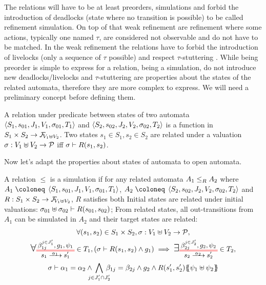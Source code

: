 \documentclass{article}
\begin{document}
The relations will have to be at least preorders, simulations and forbid the introduction of deadlocks (state where no transition is possible) to be called refinement simulation.
On top of that weak refinement are refinement where some actions, typically one named \(\tau\), are considered not observable and do not have to be matched.
In the weak refinement the relations have to forbid the introduction of livelocks (only a sequence of \(\tau\) possible) and respect \(\tau\)-stuttering .
While being preorder is simple to express for a relation, being a simulation, do not introduce new deadlocks/livelocks and \(\tau\)-stuttering are properties about the states of the related automata, therefore they are more complex to express.
We will need a preliminary concept before defining them.
\begin{defi}
A relation under predicate between states of two automata \(\OA{S_1}{s_{01}}{J_1}{V_1}{\sigma_{01}}{T_1}\) and \(\OA{S_2}{s_{02}}{J_2}{V_2}{\sigma_{02}}{T_2}\) is a function in \(S_1 \times S_2 \to \rformulae[V_1 \uplus V_2]\).
Two states \(s_1 \in S_1, s_2 \in S_2\) are related under a valuation \(\sigma: V_1 \uplus V_2 \to \values\) iff \(\sigma \vdash R\mpar{s_1, s_2}\).
\end{defi}
Now let's adapt the properties about states of automata to open automata.
\begin{defi}
A relation \(\leq\) is a simulation if for any related automata \(\wrel{A_1}{A_2}{R}\) where \(A_1 \defobject \OA{S_1}{s_{01}}{J_1}{V_1}{\sigma_{01}}{T_1}\), \(A_2 \defobject \OA{S_2}{s_{02}}{J_2}{V_2}{\sigma_{02}}{T_2}\) and \(R: S_1 \times S_2 \to \rformulae[V_1 \uplus V_2]\), \(R\) satisfies both
 Initial states are related under initial valuations: \(\sigma_{01} \uplus \sigma_{02} \vdash R\mpar{s_{01}, s_{02}}\);
 From related states, all out-transitions from \(A_1\) can be simulated in \(A_2\) and their target states are related:
\begin{multline*}
	\forall \mpar{s_1, s_2} \in S_1 \times S_2, \sigma: V_1 \uplus V_2 \to \values, \\
	\bigsymb{\forall} \OTx{1}{}{1}{1} \in T_1, \mpar{\sigma \vdash R\mpar{s_1, s_2} \wedge g_1} \implies \bigsymb{\exists} \OTx{2}{}{2}{2} \in T_2, \\
	\sigma \vdash \alpha_1 = \alpha_2 \wedge \bigwedge_\subbox{j \in J'_1 \cap J'_2} \beta_{1j} = \beta_{2j} \wedge g_2 \wedge R\mpar{s'_1, s'_2}\psubst{\psi_1 \uplus \psi_2}
\end{multline*}
\end{defi}
\end{document}
